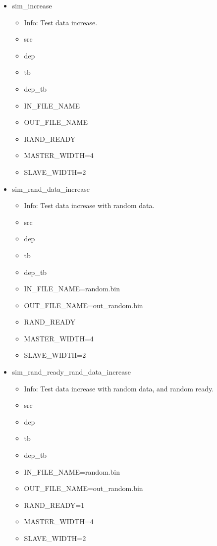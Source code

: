 \begin{itemize}
\begin{itemize}
	\item RAND\_READY=1
	\item MASTER\_WIDTH=2
	\item SLAVE\_WIDTH=4
	\end{itemize}
\item sim\_increase
	\begin{itemize}
	\item[$\space$] Info: Test data increase.
	\item src
	\item dep
	\item tb
	\item dep\_tb
	\item IN\_FILE\_NAME
	\item OUT\_FILE\_NAME
	\item RAND\_READY
	\item MASTER\_WIDTH=4
	\item SLAVE\_WIDTH=2
	\end{itemize}
\item sim\_rand\_data\_increase
	\begin{itemize}
	\item[$\space$] Info: Test data increase with random data.
	\item src
	\item dep
	\item tb
	\item dep\_tb
	\item IN\_FILE\_NAME=random.bin
	\item OUT\_FILE\_NAME=out\_random.bin
	\item RAND\_READY
	\item MASTER\_WIDTH=4
	\item SLAVE\_WIDTH=2
	\end{itemize}
\item sim\_rand\_ready\_rand\_data\_increase
	\begin{itemize}
	\item[$\space$] Info: Test data increase with random data, and random ready.
	\item src
	\item dep
	\item tb
	\item dep\_tb
	\item IN\_FILE\_NAME=random.bin
	\item OUT\_FILE\_NAME=out\_random.bin
	\item RAND\_READY=1
	\item MASTER\_WIDTH=4
	\item SLAVE\_WIDTH=2

\end{itemize}
\end{itemize}
